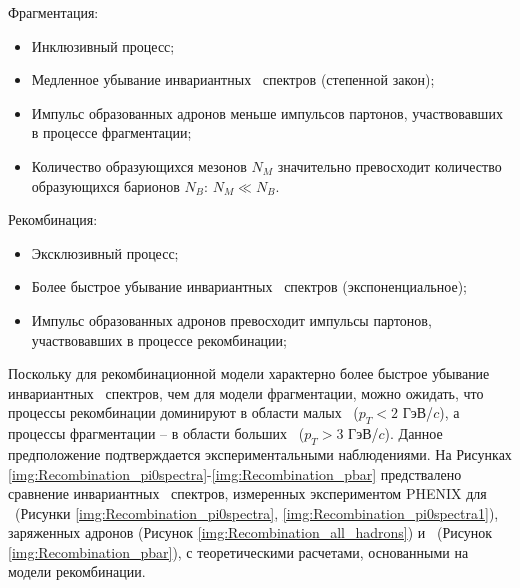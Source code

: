 Фрагментация:
\begin{itemize}[]
	\item Инклюзивный процесс;
	\item Медленное убывание инвариантных \pt \ спектров (степенной закон);
	\item Импульс образованных адронов меньше импульсов партонов, участвовавших в процессе фрагментации;
	\item Количество образующихся мезонов $N_M$ значительно превосходит количество образующихся барионов $N_B$: $N_M \ll N_B$.
\end{itemize}

Рекомбинация:
\begin{itemize}[]
	\item Эксклюзивный процесс;
	\item Более быстрое убывание инвариантных \pt \ спектров (экспоненциальное);
	\item Импульс образованных адронов превосходит импульсы партонов, участвовавших в процессе рекомбинации;
	
\end{itemize}

\begin{comment}
	Процесс фрагментации является инклюзивным, поскольку любой жесткий партон ($p_T > 5$) может фрагментировать с образованием новых адронов, тогда как для рекомбинации необходимо, чтобы они находились в на расстоянии в фазовом пространстве меньшем, чем радиус рекомбинации. 
	Инвариантный \pt \ спектр адронов, предсказываемый моделью фрагментации, имеет более медленный спад по сравнению с тем, что предсказывает модель рекомбинаци. Фрагментация значительно благоприятствует образованию мезонов, поскольку при фрагментации с гораздо большей вероятностью образуется кварк-антикварковая пара, чем дикварк [4]. 4]; при рекомбинации они образуются примерно в равной степени.
\end{comment}
Поскольку для рекомбинационной модели характерно более быстрое убывание инвариантных \pt \ спектров, чем  для модели фрагментации, можно ожидать, что процессы рекомбинации доминируют в области малых \pt \ ($p_T<2$ ГэВ/$c$), а процессы фрагментации -- в области больших \pt \ ($p_T>3$ ГэВ/$c$). Данное предположение подтверждается экспериментальными наблюдениями. На Рисунках \ref{img:Recombination_pi0spectra}-\ref{img:Recombination_pbar} предствалено сравнение инвариантных \pt \ спектров, измеренных экспериментом PHENIX для \pio \ (Рисунки \ref{img:Recombination_pi0spectra}, \ref{img:Recombination_pi0spectra1}), заряженных адронов (Рисунок \ref{img:Recombination_all_hadrons}) и \aprot \ (Рисунок \ref{img:Recombination_pbar}), с теоретическими расчетами, основанными на модели рекомбинации. 

